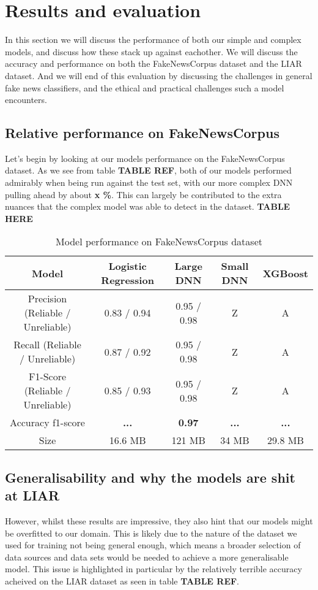 \section{Results and evaluation}
In this section we will discuss the performance of both our simple and complex models, and discuss how these stack up
against eachother. We will discuss the accuracy and performance on both the FakeNewsCorpus dataset and the LIAR
dataset. And we will end of this evaluation by discussing the challenges in general fake news classifiers, and the
ethical and practical challenges such a model encounters.

\subsection{Relative performance on FakeNewsCorpus}
Let's begin by looking at our models performance on the FakeNewsCorpus dataset. As we see from table \textbf{TABLE REF},
both of our models performed admirably when being run against the test set, with our more complex DNN pulling ahead by
about \textbf{x \%}. This can largely be contributed to the extra nuances that the complex model was able to detect in
the dataset.
\newline
\textbf{TABLE HERE}
\newline

\begin{table}[htpb]
  \centering
  \caption{Model performance on FakeNewsCorpus dataset}
  \label{tab:fakenewsperformance}

  \begin{tabular}{c|cccc}
    Model & Logistic Regression & Large DNN & Small DNN & XGBoost \\ \hline
    Precision (Reliable / Unreliable) & 0.83 / 0.94 & 0.95 / 0.98 & Z & A \\ \hline
    Recall (Reliable / Unreliable) & 0.87 / 0.92 & 0.95 / 0.98 & Z & A \\ \hline
    F1-Score (Reliable / Unreliable) & 0.85 / 0.93 & 0.95 / 0.98 & Z & A \\ \hline
    Accuracy f1-score & \textbf{...} & \textbf{0.97} & \textbf{...} & \textbf{...} \\ \hline
    Size & 16.6 MB & 121 MB & 34 MB & 29.8 MB 
  \end{tabular}
\end{table}

\subsection{Generalisability and why the models are shit at LIAR}
However, whilst these results are impressive, they also hint that our models might be overfitted to our domain. This is
likely due to the nature of the dataset we used for training not being general enough, which means a broader selection
of data sources and data sets would be needed to achieve a more generalisable model. This issue is highlighted in
particular by the relatively terrible accuracy acheived on the LIAR dataset as seen in table \textbf{TABLE REF}.

